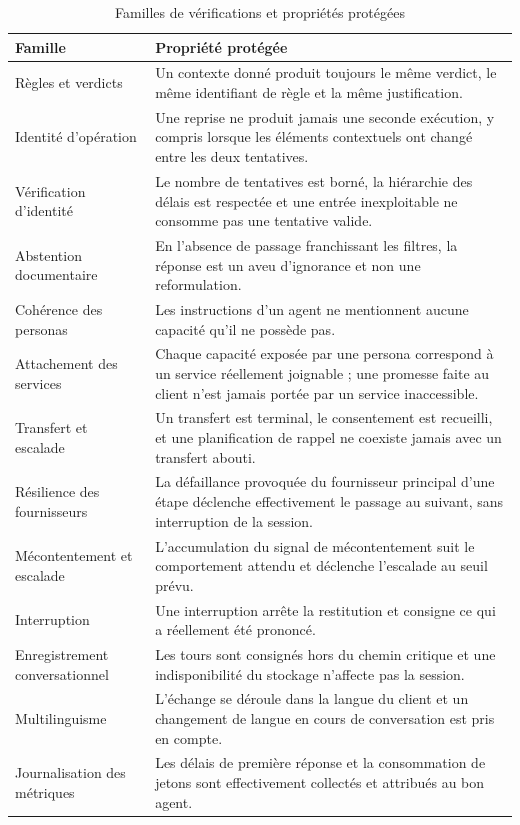 \begin{table}[H]
\centering
\renewcommand{\arraystretch}{1.2}
\begin{tabular}{|p{4.4cm}|p{10.1cm}|}
\hline
\textbf{Famille} & \textbf{Propriété protégée} \\
\hline
Règles et verdicts & Un contexte donné produit toujours le même verdict, le même identifiant de règle et la même justification. \\
\hline
Identité d'opération & Une reprise ne produit jamais une seconde exécution, y compris lorsque les éléments contextuels ont changé entre les deux tentatives. \\
\hline
Vérification d'identité & Le nombre de tentatives est borné, la hiérarchie des délais est respectée et une entrée inexploitable ne consomme pas une tentative valide. \\
\hline
Abstention documentaire & En l'absence de passage franchissant les filtres, la réponse est un aveu d'ignorance et non une reformulation. \\
\hline
Cohérence des personas & Les instructions d'un agent ne mentionnent aucune capacité qu'il ne possède pas. \\
\hline
Attachement des services & Chaque capacité exposée par une persona correspond à un service réellement joignable ; une promesse faite au client n'est jamais portée par un service inaccessible. \\
\hline
Transfert et escalade & Un transfert est terminal, le consentement est recueilli, et une planification de rappel ne coexiste jamais avec un transfert abouti. \\
\hline
Résilience des fournisseurs & La défaillance provoquée du fournisseur principal d'une étape déclenche effectivement le passage au suivant, sans interruption de la session. \\
\hline
Mécontentement et escalade & L'accumulation du signal de mécontentement suit le comportement attendu et déclenche l'escalade au seuil prévu. \\
\hline
Interruption & Une interruption arrête la restitution et consigne ce qui a réellement été prononcé. \\
\hline
Enregistrement conversationnel & Les tours sont consignés hors du chemin critique et une indisponibilité du stockage n'affecte pas la session. \\
\hline
Multilinguisme & L'échange se déroule dans la langue du client et un changement de langue en cours de conversation est pris en compte. \\
\hline
Journalisation des métriques & Les délais de première réponse et la consommation de jetons sont effectivement collectés et attribués au bon agent. \\
\hline
\end{tabular}
\caption{Familles de vérifications et propriétés protégées}
\label{tab:tests}
\end{table}

